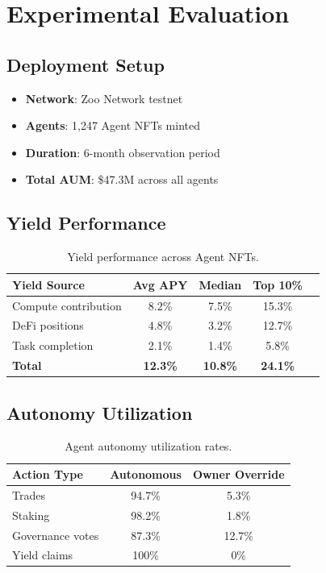 \section{Experimental Evaluation}

\label{sec:evaluation}

\subsection{Deployment Setup}

\begin{itemize}
    \item \textbf{Network}: Zoo Network testnet
    \item \textbf{Agents}: 1,247 Agent NFTs minted
    \item \textbf{Duration}: 6-month observation period
    \item \textbf{Total AUM}: \$47.3M across all agents
\end{itemize}

\subsection{Yield Performance}

\begin{table}[t]
\centering
\begin{tabular}{lcccc}
\toprule
\textbf{Yield Source} & \textbf{Avg APY} & \textbf{Median} & \textbf{Top 10\%} \\
\midrule
Compute contribution & 8.2\% & 7.5\% & 15.3\% \\
DeFi positions & 4.8\% & 3.2\% & 12.7\% \\
Task completion & 2.1\% & 1.4\% & 5.8\% \\
\midrule
\textbf{Total} & \textbf{12.3\%} & \textbf{10.8\%} & \textbf{24.1\%} \\
\bottomrule
\end{tabular}
\caption{Yield performance across Agent NFTs.}
\label{tab:yield}
\end{table}

\subsection{Autonomy Utilization}

\begin{table}[t]
\centering
\begin{tabular}{lcc}
\toprule
\textbf{Action Type} & \textbf{Autonomous} & \textbf{Owner Override} \\
\midrule
Trades & 94.7\% & 5.3\% \\
Staking & 98.2\% & 1.8\% \\
Governance votes & 87.3\% & 12.7\% \\
Yield claims & 100\% & 0\% \\
\bottomrule
\end{tabular}
\caption{Agent autonomy utilization rates.}
\label{tab:autonomy}
\end{table}

